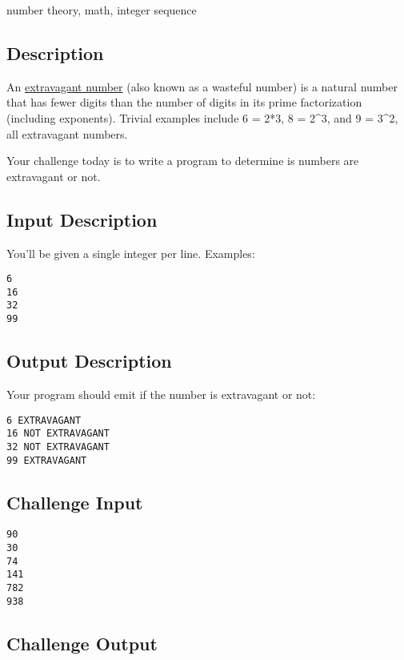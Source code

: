 number theory, math, integer sequence

\subsection{Description}\label{description-24}

An \href{https://en.wikipedia.org/wiki/Extravagant_number}{extravagant
number} (also known as a wasteful number) is a natural number that has
fewer digits than the number of digits in its prime factorization
(including exponents). Trivial examples include 6 = 2*3, 8 = 2\^{}3, and
9 = 3\^{}2, all extravagant numbers.

Your challenge today is to write a program to determine is numbers are
extravagant or not.

\subsection{Input Description}\label{input-description-16}

You'll be given a single integer per line. Examples:

\begin{verbatim}
6
16
32
99
\end{verbatim}

\subsection{Output Description}\label{output-description-17}

Your program should emit if the number is extravagant or not:

\begin{verbatim}
6 EXTRAVAGANT
16 NOT EXTRAVAGANT
32 NOT EXTRAVAGANT
99 EXTRAVAGANT
\end{verbatim}

\subsection{Challenge Input}\label{challenge-input-18}

\begin{verbatim}
90
30
74
141
782
938
\end{verbatim}

\subsection{Challenge Output}\label{challenge-output-15}

